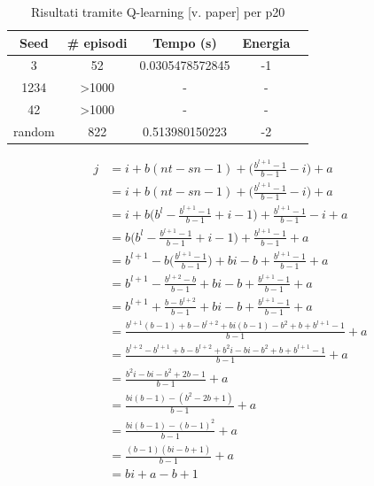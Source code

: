 \documentclass[conference]{IEEEtran}
\begin{document}
\begin{table}[H]
\begin{center}
\begin{tabular}{|c|c|c|c|c|}
\hline
\textbf{Seed} & \textbf{\# episodi} & \textbf{Tempo (s)} & \textbf{Energia} \\ \hline
3 & 52 & 0.0305478572845 & -1 \\ \hline
1234 & >1000 & - & - \\ \hline
42 & >1000 & - & - \\ \hline
random & 822 & 0.513980150223 & -2 \\ \hline
\end{tabular}
\end{center}
\caption{Risultati tramite Q-learning [v. paper] per p20}
\end{table}

\appendix
\label{appendix:sviluppo}

\begin{equation}
\begin{split}
j   & = i + b(nt - sn - 1) + \bigg(\frac{b^{l + 1} - 1}{b - 1} - i\bigg) + a\\
    & = i + b(nt - sn - 1) + \bigg(\frac{b^{l + 1} - 1}{b - 1} - i\bigg) + a\\
    & = i + b\bigg(b^{l} - \frac{b^{l + 1} - 1}{b - 1} + i - 1\bigg) + \frac{b^{l + 1} - 1}{b - 1} - i + a\\
    & = b\bigg(b^{l} - \frac{b^{l + 1} - 1}{b - 1} + i - 1\bigg) + \frac{b^{l + 1} - 1}{b - 1} + a\\
    & = b^{l + 1} - b\bigg(\frac{b^{l + 1} - 1}{b - 1}\bigg) + bi -b + \frac{b^{l + 1} - 1}{b - 1} + a\\
    & = b^{l + 1} - \frac{b^{l + 2} - b}{b - 1} + bi -b + \frac{b^{l + 1} - 1}{b - 1} + a\\
    & = b^{l + 1} + \frac{b - b^{l + 2}}{b - 1} + bi -b + \frac{b^{l + 1} - 1}{b - 1} + a\\
    & = \frac{b^{l + 1}(b - 1) + b - b^{l + 2} + bi(b - 1) -b^2 + b + b^{l + 1} - 1}{b - 1} + a\\
    & = \frac{b^{l + 2} - b^{l + 1} + b - b^{l + 2} + b^2i - bi -b^2 + b + b^{l + 1} - 1}{b - 1} + a\\
    & = \frac{b^2i - bi - b^2 + 2b - 1}{b - 1} + a\\
    & = \frac{bi(b - 1) - (b^2 - 2b + 1)}{b - 1} + a\\
    & = \frac{bi(b - 1) - (b - 1)^2}{b - 1} + a\\
    & = \frac{(b -1)(bi - b + 1)}{b-1} + a\\
    & = bi + a - b + 1
\end{split}
\end{equation}
\end{document}
